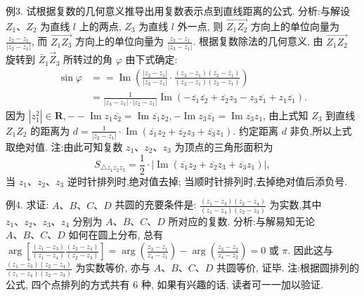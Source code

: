 例3. 试根据复数的几何意义推导出用复数表示点到直线距离的公式.
分析:与解设 $Z_1 、 Z_2$ 为直线 $l$ 上的两点, $Z_3$ 为直线 $l$ 外一点, 则 $\overrightarrow{Z_1 Z_2}$ 方向上的单位向量为 $\frac{z_2-z_1}{\left|z_2-z_1\right|}$, 而 $\overrightarrow{Z_1 Z_3}$ 方向上的单位向量为 $\frac{z_3-z_1}{\left|z_3-z_1\right|}$. 根据复数除法的几何意义, 由 $\overrightarrow{Z_1 Z_2}$ 旋转到 $\bar{Z}_1 \vec{Z}_3$ 所转过的角 $\varphi$ 由下式确定:
$$
\begin{aligned}
\sin \varphi & ==\operatorname{Im}\left(\frac{\left|z_2-z_1\right|}{\left|z_3-z_1\right|} \cdot \frac{\left(z_3-z_1\right)\left(\overline{z_2}-\overline{z_1}\right)}{\left(z_2-z_1\right)\left(\overline{z_2}-\overline{z_1}\right)}\right) \\
& =\frac{1}{\left|z_3-z_1\right| \cdot\left|\overline{z_2}-z_1\right|} \operatorname{Im}\left(-\overline{z_1} \overline{z_2}+\overline{z_2} z_3-z_3 \overline{z_1}+z_1 \overline{z_1}\right) .
\end{aligned}
$$
因为 $\left|z_1^2\right| \in \mathbf{R},--\operatorname{Im} z_1 \overline{z_2}=\operatorname{Im} \overline{z_1} z_2,-\operatorname{Im} z_3 \overline{z_1}=\operatorname{Im} \overline{z_3} z_1$, 由上式知 $Z_3$ 到直线 $Z_1 Z_2$ 的距离为 $d=\frac{1}{\left|z_2-z_1\right|} \cdot \operatorname{Im}\left(\overline{z_1} z_2+\overline{z_2} z_3+\overline{z_3} z_1\right)$. 约定距离 $d$ 非负,所以上式取绝对值.
注:由此可知复数 $z_1 、 z_2 、 z_3$ 为顶点的三角形面积为
$$
S_{\triangle z_1 z_2 z_3}=\frac{1}{2} \cdot\left|\operatorname{Im}\left(\overline{z_1} z_2+\overline{z_2} z_3+\overline{z_3} z_1\right)\right|,
$$
当 $z_1 、 z_2 、 z_3$ 逆时针排列时,绝对值去掉; 当顺时针排列时,去掉绝对值后添负号.



例4. 求证: $A 、 B 、 C 、 D$ 共圆的充要条件是: $\frac{\left(z_1-z_3\right)\left(z_2-z_4\right)}{\left(z_1-z_4\right)\left(z_2-z_3\right)}$ 为实数,其中 $z_1 、 z_2 、 z_3 、 z_4$ 分别为 $A 、 B 、 C 、 D$ 所对应的复数.
分析:与解易知无论 $A 、 B 、 C 、 D$ 如何在圆上分布, 总有 $\arg \left[\frac{\left(z_1-z_3\right)}{\left(z_1-z_4\right)} \frac{\left(z_2-z_4\right)}{\left(z_2-z_3\right)}\right]=\arg \left(\frac{z_3-z_1}{z_4-z_1}\right)-\arg \left(\frac{z_3-z_2}{z_4-z_2}\right)=0$ 或 $\pi$. 因此这与 $\frac{\left(z_1-z_3\right)\left(z_2-z_4\right)}{\left(z_1-z_4\right)\left(z_2-z_3\right)}$ 为实数等价, 亦与 $A 、 B 、 C 、 D$ 共圆等价, 证毕.
注:根据圆排列的公式, 四个点排列的方式共有 6 种, 如果有兴趣的话, 读者可一一加以验证.



